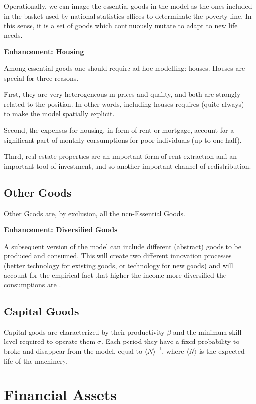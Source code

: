 \documentclass[a4paper, headings=standardclasses]{scrartcl}
\newenvironment{enh}[1][]{\begin{framed}\noindent\textbf{Enhancement: #1}\par}{\end{framed}}
\begin{document}
Operationally, we can image the essential goods in the model as the ones included in the basket used by national statistics offices to determinate the poverty line. In this sense, it is a set of goods which continuously mutate to adapt to new life needs.

\begin{enh}[Housing]
	Among essential goods one should require ad hoc modelling: houses. Houses are special for three reasons.

	First, they are very heterogeneous in prices and quality, and both are strongly related to the position. In other words, including houses requires (quite always) to make the model spatially explicit.

	Second, the expenses for housing, in form of rent or mortgage, account for a significant part of monthly consumptions for poor individuals (up to one half).

	Third, real estate properties are an important form of rent extraction and an important tool of investment, and so another important channel of redistribution.
\end{enh}

\subsection{Other Goods}
Other Goods are, by exclusion, all the non-Essential Goods.

\begin{enh}[Diversified Goods]
	A subsequent version of the model can include different (abstract) goods to be produced and consumed. This will  create two different innovation processes (better technology for existing goods, or technology for new goods) and will account for the empirical fact that higher the income more diversified the consumptions are \parencite[cfr.][§2]{didomenico2022}.
\end{enh}

\subsection{Capital Goods}
Capital goods are characterized by their productivity $\beta$ and the minimum skill level required to operate them $\sigma$. Each period they have a fixed probability to broke and disappear from the model, equal to $\langle N \rangle^{-1}$, where $\langle N \rangle$ is the expected life of the machinery.

\section{Financial Assets}
\end{document}
